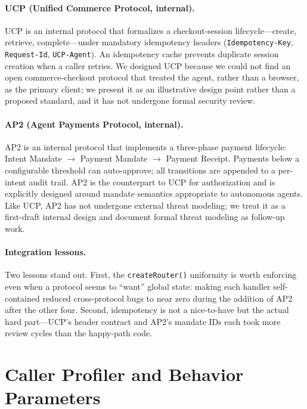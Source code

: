 \documentclass[11pt]{article}
\begin{document}
\paragraph{UCP (Unified Commerce Protocol, internal).} UCP is an internal protocol that formalizes a checkout-session lifecycle---create, retrieve, complete---under mandatory idempotency headers (\texttt{Idempotency-Key}, \texttt{Request-Id}, \texttt{UCP-Agent}). An idempotency cache prevents duplicate session creation when a caller retries. We designed UCP because we could not find an open commerce-checkout protocol that treated the agent, rather than a browser, as the primary client; we present it as an illustrative design point rather than a proposed standard, and it has not undergone formal security review.

\paragraph{AP2 (Agent Payments Protocol, internal).} AP2 is an internal protocol that implements a three-phase payment lifecycle: Intent Mandate $\rightarrow$ Payment Mandate $\rightarrow$ Payment Receipt. Payments below a configurable threshold can auto-approve; all transitions are appended to a per-intent audit trail. AP2 is the counterpart to UCP for authorization and is explicitly designed around mandate semantics appropriate to autonomous agents. Like UCP, AP2 has not undergone external threat modeling; we treat it as a first-draft internal design and document formal threat modeling as follow-up work.

\paragraph{Integration lessons.} Two lessons stand out. First, the \texttt{createRouter()} uniformity is worth enforcing even when a protocol seems to ``want'' global state: making each handler self-contained reduced cross-protocol bugs to near zero during the addition of AP2 after the other four. Second, idempotency is not a nice-to-have but the actual hard part---UCP's header contract and AP2's mandate IDs each took more review cycles than the happy-path code.

\section{Caller Profiler and Behavior Parameters}
\label{sec:profiler}
\end{document}
